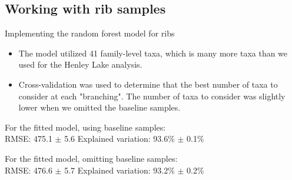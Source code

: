\documentclass{beamer}
\begin{document}
\subsection[Ribs]{Working with rib samples}

\begin{frame}{Implementing the random forest model for ribs}

\begin{itemize}
\item The model utilized 41 family-level taxa, which is many more taxa
  than we used for the Henley Lake analysis.
\item Cross-validation was used to determine that the best number of
  taxa to consider at each "branching".  The number of taxa to
  consider was slightly lower when we omitted the baseline samples.
\end{itemize}

\vspace{0.1in}

\noindent For the fitted model, using baseline samples:\\
\noindent RMSE: 475.1 $\pm$ 5.6  \hspace{0.05in}  Explained variation: 93.6\%
$\pm$ 0.1\%

\vspace{0.1in}

\noindent For the fitted model, omitting baseline samples:\\
\noindent RMSE: 476.6 $\pm$ 5.7  \hspace{0.05in}  Explained variation: 93.2\%
$\pm$ 0.2\%

\end{frame}
\end{document}
